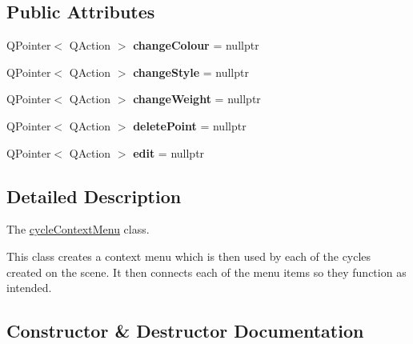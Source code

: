 \subsection*{Public Attributes}
\begin{DoxyCompactItemize}
\item 
\mbox{\label{classcycle_context_menu_a1e2215915914b4c36463cbe5e667722d}} 
Q\+Pointer$<$ Q\+Action $>$ {\bfseries change\+Colour} = nullptr
\item 
\mbox{\label{classcycle_context_menu_a61f2889cd624664ec0b4933def974a04}} 
Q\+Pointer$<$ Q\+Action $>$ {\bfseries change\+Style} = nullptr
\item 
\mbox{\label{classcycle_context_menu_a9798e2ec98b4e15af313112411cd8a24}} 
Q\+Pointer$<$ Q\+Action $>$ {\bfseries change\+Weight} = nullptr
\item 
\mbox{\label{classcycle_context_menu_aa58c68008bb6ab0d70af517821b8a48f}} 
Q\+Pointer$<$ Q\+Action $>$ {\bfseries delete\+Point} = nullptr
\item 
\mbox{\label{classcycle_context_menu_a7c9b8d13930dc91c050e5b870f7dbfb8}} 
Q\+Pointer$<$ Q\+Action $>$ {\bfseries edit} = nullptr
\end{DoxyCompactItemize}


\subsection{Detailed Description}
The \mbox{\hyperlink{classcycle_context_menu}{cycle\+Context\+Menu}} class. 

This class creates a context menu which is then used by each of the cycles created on the scene. It then connects each of the menu items so they function as intended. 

\subsection{Constructor \& Destructor Documentation}
\mbox{\label{classcycle_context_menu_a0a948765494ab4b2ecf73c89123f7f14}} 
